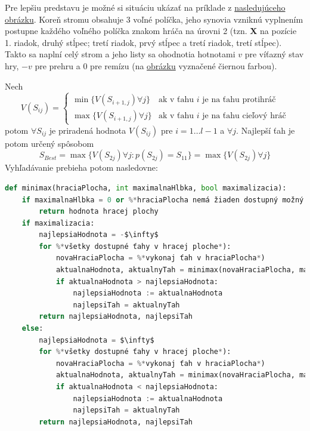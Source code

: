 Pre lepšiu predstavu je možné si situáciu ukázať na príklade z \hyperref[figure:minimax-tree]{nasledujúceho obrázku}.
Koreň stromu obsahuje 3 voľné políčka, jeho synovia vzniknú vyplnením postupne každého voľného políčka znakom hráča na
úrovni 2 (tzn. \textbf{X} na pozície 1. riadok, druhý stĺpec; tretí riadok, prvý stĺpec a tretí riadok, tretí stĺpec).
Takto sa naplní celý strom a jeho listy sa ohodnotia hotnotami $v$ pre víťazný stav hry, $-v$ pre prehru a $0$ pre
remízu (na \hyperref[figure:minimax-tree]{obrázku} vyznačené čiernou farbou).

Nech
\begin{equation}
    V(S_{ij}) =
    \begin{cases}
        \min{\{V(S_{i+1,j}) \forall j\}} & \text{ak v ťahu } i \text{ je na ťahu protihráč} \\
        \max{\{V(S_{i+1,j}) \forall j\}} & \text{ak v ťahu } i \text{ je na ťahu cieľový hráč}
    \end{cases}
\end{equation}
potom $\forall S_{ij}$ je priradená hodnota $V(S_{ij})$ pre $i = 1 \dots l-1$ a $\forall j$.
Najlepší ťah je potom určený spôsobom
\begin{equation}
    S_{Best} = \max{\{V(S_{2j}) \forall j \colon p(S_{2j}) = S_{11}\}} = \max{\{V(S_{2j}) \forall j\}}
\end{equation}
Vyhľadávanie prebieha potom nasledovne:
\begin{tiny}
    \begin{lstlisting}[language=Python]
def minimax(hraciaPlocha, int maximalnaHlbka, bool maximalizacia):
    if maximalnaHlbka = 0 or %*hraciaPlocha nemá žiaden dostupný možný ťah*):
        return hodnota hracej plochy
    if maximalizacia:
        najlepsiaHodnota = -$\infty$
        for %*všetky dostupné ťahy v hracej ploche*):
            novaHraciaPlocha = %*vykonaj ťah v hraciaPlocha*)
            aktualnaHodnota, aktualnyTah = minimax(novaHraciaPlocha, maximalnaHlbka - 1, false))
            if aktualnaHodnota > najlepsiaHodnota:
                najlepsiaHodnota := aktualnaHodnota
                najlepsiTah = aktualnyTah
        return najlepsiaHodnota, najlepsiTah
    else:
        najlepsiaHodnota = $\infty$
        for %*všetky dostupné ťahy v hracej ploche*):
            novaHraciaPlocha = %*vykonaj ťah v hraciaPlocha*)
            aktualnaHodnota, aktualnyTah = minimax(novaHraciaPlocha, maximalnaHlbka - 1, true))
            if aktualnaHodnota < najlepsiaHodnota:
                najlepsiaHodnota := aktualnaHodnota
                najlepsiTah = aktualnyTah
        return najlepsiaHodnota, najlepsiTah
\end{lstlisting}
\end{tiny}

